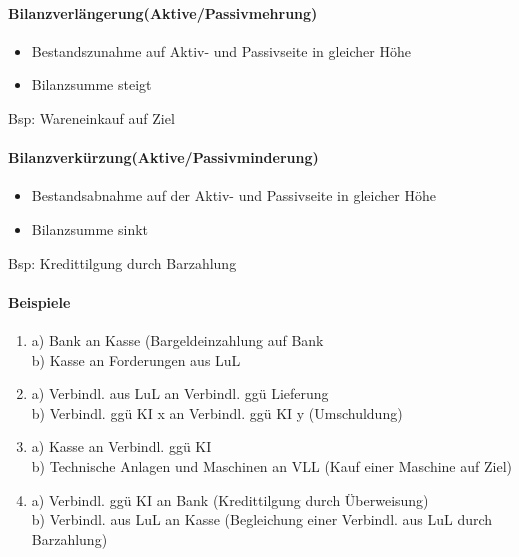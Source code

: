 \documentclass[paper=a4, fontsize=11pt]{scrartcl}
\numberwithin{equation}{section}
\numberwithin{figure}{section}
\numberwithin{table}{section}
\begin{document}
\paragraph{Bilanzverlängerung(Aktive/Passivmehrung)}
\begin{itemize}
\item Bestandszunahme auf Aktiv- und Passivseite in gleicher Höhe
\item Bilanzsumme steigt
\end{itemize}
Bsp: Wareneinkauf auf Ziel
\paragraph{Bilanzverkürzung(Aktive/Passivminderung)}
\begin{itemize}
\item Bestandsabnahme auf der Aktiv- und Passivseite in gleicher Höhe
\item Bilanzsumme sinkt
\end{itemize}
Bsp: Kredittilgung durch Barzahlung

\paragraph{Beispiele}
\begin{enumerate}
\item a) Bank an Kasse (Bargeldeinzahlung auf Bank \\
b) Kasse an Forderungen aus LuL 
\item a) Verbindl. aus LuL an Verbindl. ggü Lieferung\\
b) Verbindl. ggü KI x an Verbindl. ggü KI y (Umschuldung)
\item a) Kasse an Verbindl. ggü KI \\
b) Technische Anlagen und Maschinen an VLL (Kauf einer Maschine auf Ziel)
\item a) Verbindl. ggü KI an Bank (Kredittilgung durch Überweisung) \\
b) Verbindl. aus LuL an Kasse (Begleichung einer Verbindl. aus LuL durch Barzahlung)
\end{enumerate}
\end{document}
